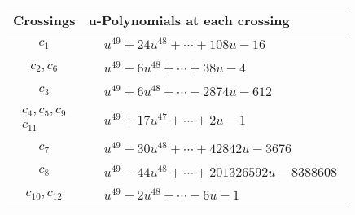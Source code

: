 \documentclass[1p]{elsarticle_modified}
\theoremstyle{definition}
\begin{document}
\begin{tabular}{m{50pt}|m{274pt}}
Crossings & \hspace{64pt}u-Polynomials at each crossing \\
\hline $$\begin{aligned}c_{1}\end{aligned}$$&$\begin{aligned}
&u^{49}+24 u^{48}+\cdots+108 u-16
\end{aligned}$\\
\hline $$\begin{aligned}c_{2},c_{6}\end{aligned}$$&$\begin{aligned}
&u^{49}-6 u^{48}+\cdots+38 u-4
\end{aligned}$\\
\hline $$\begin{aligned}c_{3}\end{aligned}$$&$\begin{aligned}
&u^{49}+6 u^{48}+\cdots-2874 u-612
\end{aligned}$\\
\hline $$\begin{aligned}c_{4},c_{5},c_{9}\\c_{11}\end{aligned}$$&$\begin{aligned}
&u^{49}+17 u^{47}+\cdots+2 u-1
\end{aligned}$\\
\hline $$\begin{aligned}c_{7}\end{aligned}$$&$\begin{aligned}
&u^{49}-30 u^{48}+\cdots+42842 u-3676
\end{aligned}$\\
\hline $$\begin{aligned}c_{8}\end{aligned}$$&$\begin{aligned}
&u^{49}-44 u^{48}+\cdots+201326592 u-8388608
\end{aligned}$\\
\hline $$\begin{aligned}c_{10},c_{12}\end{aligned}$$&$\begin{aligned}
&u^{49}-2 u^{48}+\cdots-6 u-1
\end{aligned}$\\
\hline
\end{tabular}\\~\\
\end{document}
